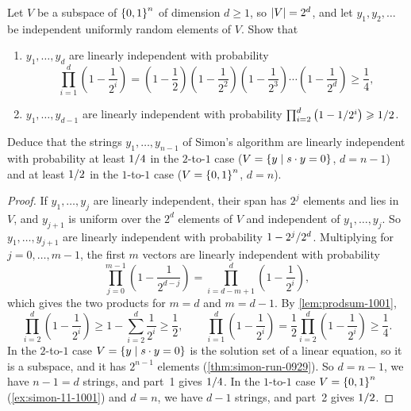 \begin{exercisebox}
\begin{exercise}\label{ex:indep-1001}\label{thm:indep-1001}
    Let $V$ be a subspace of $\left\lbrace0,1\right\rbrace^n$ of dimension $d \geq 1$, so $\left\lvert V\right\rvert = 2^d$, and let
    $y_1, y_2, \dots$ be independent uniformly random elements of $V$. Show that
    \begin{enumerate}
        \item $y_1, \dots, y_d$ are linearly independent with probability
              \[\prod_{i=1}^{d} \left(1 - \frac{1}{2^i}\right)
                  = \left(1 - \frac{1}{2}\right)\left(1 - \frac{1}{2^2}\right)\left(1 - \frac{1}{2^3}\right) \cdots \left(1 - \frac{1}{2^d}\right)
                  \geq \frac{1}{4},\]
        \item $y_1, \dots, y_{d-1}$ are linearly independent with probability
              $\prod_{i=2}^{d} \left(1 - 1/2^i\right) \geqslant 1/2$.
    \end{enumerate}
    Deduce that the strings $y_1, \dots, y_{n-1}$ of Simon's algorithm are linearly independent with
    probability at least $1/4$ in the $2$-to-$1$ case
    ($V = \left\lbrace y \mid s \cdot y = 0\right\rbrace$, $d = n - 1$) and at least $1/2$ in the
    $1$-to-$1$ case ($V = \left\lbrace0,1\right\rbrace^n$, $d = n$).
\end{exercise}
\tcblower
\begin{proof}
    If $y_1, \dots, y_j$ are linearly independent, their span has $2^j$ elements and lies in $V$,
    and $y_{j+1}$ is uniform over the $2^d$ elements of $V$ and independent of $y_1, \dots, y_j$. So $y_1, \dots, y_{j+1}$ are linearly independent with
    probability $1 - 2^j/2^d$. Multiplying for $j = 0, \dots, m-1$, the first $m$ vectors are
    linearly independent with probability
    \[\prod_{j=0}^{m-1} \left(1 - \frac{1}{2^{d-j}}\right) = \prod_{i=d-m+1}^{d} \left(1 - \frac{1}{2^i}\right),\]
    which gives the two products for $m = d$ and $m = d - 1$. By \cref{lem:prodsum-1001},
    \[\prod_{i=2}^{d} \left(1 - \frac{1}{2^i}\right) \geq 1 - \sum_{i=2}^{d} \frac{1}{2^i} \geq \frac{1}{2},
        \qquad
        \prod_{i=1}^{d} \left(1 - \frac{1}{2^i}\right) = \frac{1}{2} \prod_{i=2}^{d} \left(1 - \frac{1}{2^i}\right) \geq \frac{1}{4}.\]
    In the $2$-to-$1$ case $V = \left\lbrace y \mid s \cdot y = 0\right\rbrace$ is the solution set of a linear
    equation, so it is a subspace, and it has $2^{n-1}$ elements (\cref{thm:simon-run-0929}). So
    $d = n - 1$, we have $n - 1 = d$ strings, and part~1 gives $1/4$. In the $1$-to-$1$ case
    $V = \left\lbrace0,1\right\rbrace^n$ (\cref{ex:simon-11-1001}) and $d = n$, we have $d - 1$ strings, and part~2
    gives $1/2$.
\end{proof}
\end{exercisebox}
